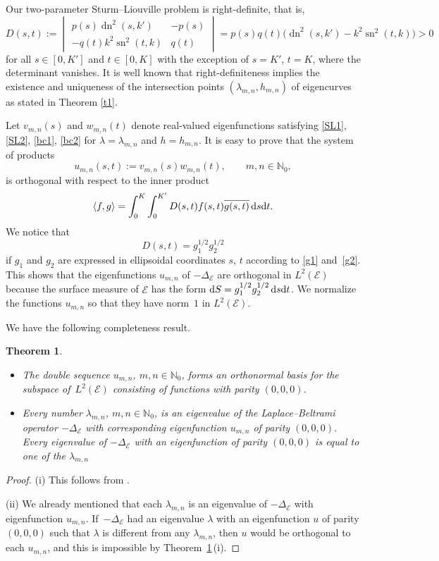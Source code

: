\documentclass[pdftex]{sigma}
\newtheorem{thm}{Theorem}[section]
\newcommand{\N}{\mathbb{N}}
\newcommand{\E}{\mathcal{E}}
\newcommand{\D}{\Delta_\E}
\DeclareMathOperator{\sn}{sn}
\DeclareMathOperator{\dn}{dn}
\numberwithin{equation}{section}
\begin{document}
Our two-parameter Sturm--Liouville problem is right-definite, that is,
\setlength{\arraycolsep}{1mm}
\[ D(s,t):=\begin{vmatrix} p(s)\dn^2(s,k') & -p(s) \\ -q(t) k^2\sn^2(t,k) & q(t)\end{vmatrix}=p(s)q(t)\bigl(\dn^2(s,k')-k^2\sn^2(t,k)\bigr)>0 \]
for all $s\in[0,K']$ and $t\in[0,K]$ with the exception of $s=K'$, $t=K$, where the determinant vanishes.
It is well known \cite[Theorem 5.5.1]{AM} that right-definiteness implies the existence and uniqueness of the intersection points $(\lambda_{m,n},h_{m,n})$ of eigencurves as stated in Theorem \ref{t1}.

Let $v_{m,n}(s)$ and $w_{m,n}(t)$ denote real-valued eigenfunctions
satisfying \eqref{SL1}, \eqref{SL2}, \eqref{bc1}, \eqref{bc2} for $\lambda=\lambda_{m,n}$ and $h=h_{m,n}$.
It is easy to prove \cite[Section 3.5]{AM} that the system
of products
\[ u_{m,n}(s,t):=v_{m,n}(s)w_{m,n}(t),\qquad m,n\in\N_0,\]
is orthogonal with respect to the
inner product
\[
\langle f,g\rangle=\int_0^K \int_0^{K'} D(s,t) f(s,t)\overline{g(s,t)}\,{\rm d}s{\rm d}t.
\]
We notice that
\[ D(s,t)=g_1^{1/2}g_2^{1/2} \]
if $g_1$ and $g_2$ are expressed in ellipsoidal coordinates $s$, $t$ according to \eqref{g1} and~\eqref{g2}.
This shows that the eigenfunctions $u_{m,n}$ of $-\D$ are orthogonal
in $L^2(\E)$ because the surface measure of $\E$ has the form ${\rm d}S =g_1^{1/2}g_2^{1/2}\,{\rm d}s {\rm d}t$.
We normalize the functions $u_{m,n}$ so that they have norm~$1$ in $L^2(\E)$.

We have the following completeness result.

\begin{thm}\label{t2}\quad
\begin{itemize}\itemsep=0pt
\item[$(i)$] The double sequence $u_{m,n}$, $m,n\in\N_0$,
forms an orthonormal basis for the subspace of~$L^2(\E)$ consisting of functions with parity $(0,0,0)$.

\item[$(ii)$]
Every number $\lambda_{m,n}$, $m,n\in\N_0$, is an eigenvalue of the Laplace--Beltrami operator $-\D$
with corresponding eigenfunction $u_{m,n}$ of parity $(0,0,0)$.
Every eigenvalue of $-\D$ with an eigenfunction of parity $(0,0,0)$ is equal to one of the $\lambda_{m,n}$
\end{itemize}
\end{thm}
\begin{proof}
(i) This follows from \cite[Theorem 6.8.3]{Vbook}.

(ii)
We already mentioned that each $\lambda_{m,n}$ is an eigenvalue of $-\D$ with eigenfunction $u_{m,n}$.
If~$-\D$ had an eigenvalue $\lambda$ with an eigenfunction $u$ of parity $(0,0,0)$ such that
$\lambda$ is different from any $\lambda_{m,n}$, then $u$ would be orthogonal to each $u_{m,n}$, and this is impossible by
Theorem~\ref{t2}\,(i).
\end{proof}
\end{document}
